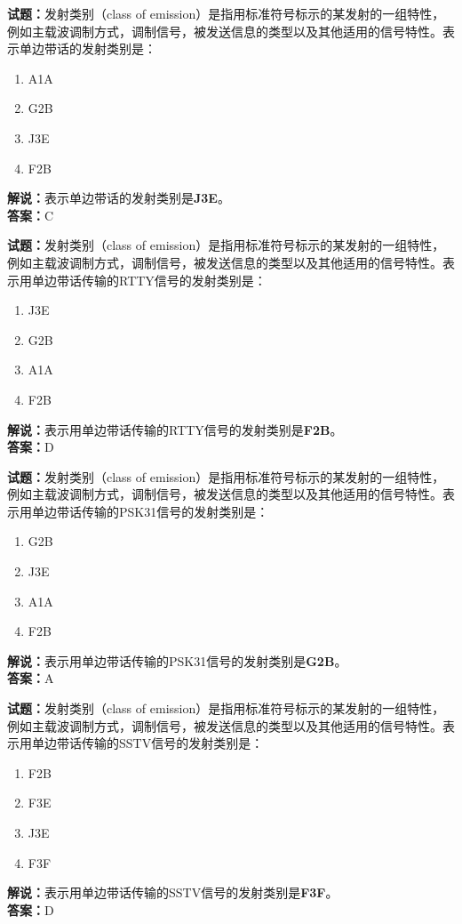 \documentclass{ctexbook}
\begin{document}
\bigskip

\noindent\textbf{试题：}发射类别（class of emission）是指用标准符号标示的某发射的一组特性，例如主载波调制方式，调制信号，被发送信息的类型以及其他适用的信号特性。表示单边带话的发射类别是：
\begin{enumerate}[leftmargin=3em]
  \item A1A
  \item G2B
  \item J3E
  \item F2B
\end{enumerate}
\noindent\textbf{解说：}表示单边带话的发射类别是\textbf{J3E}。\\\noindent\textbf{答案：}C

\bigskip

\noindent\textbf{试题：}发射类别（class of emission）是指用标准符号标示的某发射的一组特性，例如主载波调制方式，调制信号，被发送信息的类型以及其他适用的信号特性。表示用单边带话传输的RTTY信号的发射类别是：
\begin{enumerate}[leftmargin=3em]
  \item J3E
  \item G2B
  \item A1A
  \item F2B
\end{enumerate}
\noindent\textbf{解说：}表示用单边带话传输的RTTY信号的发射类别是\textbf{F2B}。\\\noindent\textbf{答案：}D

\bigskip

\noindent\textbf{试题：}发射类别（class of emission）是指用标准符号标示的某发射的一组特性，例如主载波调制方式，调制信号，被发送信息的类型以及其他适用的信号特性。表示用单边带话传输的PSK31信号的发射类别是：
\begin{enumerate}[leftmargin=3em]
  \item G2B
  \item J3E
  \item A1A
  \item F2B
\end{enumerate}
\noindent\textbf{解说：}表示用单边带话传输的PSK31信号的发射类别是\textbf{G2B}。\\\noindent\textbf{答案：}A

\bigskip

\noindent\textbf{试题：}发射类别（class of emission）是指用标准符号标示的某发射的一组特性，例如主载波调制方式，调制信号，被发送信息的类型以及其他适用的信号特性。表示用单边带话传输的SSTV信号的发射类别是：
\begin{enumerate}[leftmargin=3em]
  \item F2B
  \item F3E
  \item J3E
  \item F3F
\end{enumerate}
\noindent\textbf{解说：}表示用单边带话传输的SSTV信号的发射类别是\textbf{F3F}。\\\noindent\textbf{答案：}D
\end{document}
